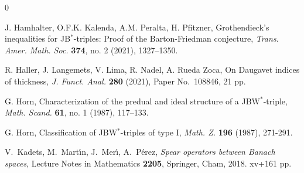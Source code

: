 \documentclass[10pt]{amsart}
\begin{document}
\begin{thebibliography}{0}
		
		 J. Hamhalter, O.F.K. Kalenda, A.M. Peralta, H. Pfitzner, Grothendieck's inequalities for {JB}$^*$-triples: {P}roof of the {B}arton-{F}riedman conjecture, \emph{Trans. Amer. Math. Soc.} \textbf{374}, no. 2 (2021), 1327--1350.
		
		
		 R. Haller, J. Langemets, V. Lima, R. Nadel, A. Rueda Zoca, On Daugavet indices of thickness, \emph{J. Funct. Anal.} \textbf{280} (2021), Paper No.~108846, 21 pp.
		
		
		
		
		
		 G. Horn, Characterization of the predual and ideal structure of a JBW$^*$-triple, \emph{Math. Scand.} \textbf{61}, no. 1 (1987), 117--133.
		
		
		 G. Horn, Classification of JBW$^*$-triples of type I, \emph{Math. Z.} \textbf{196} (1987), 271-291.
		
		 V.~Kadets, M.~Mart\'{\i}n, J.~Mer\'{\i}, A.~P\'{e}rez, \emph{Spear operators between Banach spaces}, Lecture Notes in Mathematics \textbf{2205}, Springer, Cham,  2018. xv+161 pp.
		

\end{thebibliography}
\end{document}
